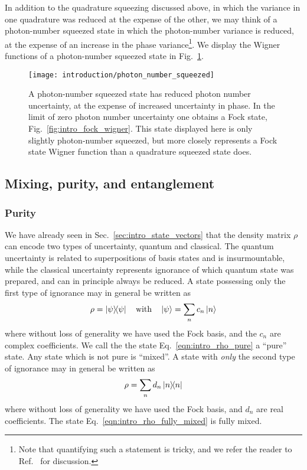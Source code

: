 In addition to the quadrature squeezing discussed above, in which the variance in one quadrature was reduced at the expense of the other, we may think of a photon-number squeezed state in which the photon-number variance is reduced, at the expense of an increase in the phase variance\footnote{Note that quantifying such a statement is tricky, and we refer the reader to Ref.~\cite{Barnett_red_book} for discussion.}. We display the Wigner functions of a photon-number squeezed state in Fig.~\ref{fig:intro_photon_number_squeezed_wigner}.

\begin{figure}[htp]
\centering
\captionsetup{width=0.8\linewidth}
\texttt{[image: introduction/photon\_number\_squeezed]}
\caption{\label{fig:intro_photon_number_squeezed_wigner} A photon-number squeezed state has reduced photon number uncertainty, at the expense of increased uncertainty in phase. In the limit of zero photon number uncertainty one obtains a Fock state, Fig.~\ref{fig:intro_fock_wigner}. This state displayed here is only slightly photon-number squeezed, but more closely represents a Fock state Wigner function than a quadrature squeezed state does. }
\end{figure}



\FloatBarrier
\subsection{Mixing, purity, and entanglement}

\subsubsection{Purity}
We have already seen in Sec.~\ref{sec:intro_state_vectors} that the density matrix $\rho$ can encode two types of uncertainty, quantum and classical. The quantum uncertainty is related to superpositions of basis states and is insurmountable, while the classical uncertainty represents ignorance of which quantum state was prepared, and can in principle always be reduced. A state possessing only the first type of ignorance may in general be written as
\begin{equation}\label{eqn:intro_rho_pure}
\rho = \dyad{\psi} \qq{with} \ket{\psi} = \sum_n c_n \ket{n}
\end{equation}
where without loss of generality we have used the Fock basis, and the $c_n$ are complex coefficients. We call the the state Eq.~\ref{eqn:intro_rho_pure} a ``pure'' state. Any state which is not pure is ``mixed''. A state with \emph{only} the second type of ignorance may in general be written as
\begin{equation}\label{eqn:intro_rho_fully_mixed}
\rho = \sum_n d_n \dyad{n}
\end{equation}
where without loss of generality we have used the Fock basis, and $d_n$ are real coefficients. The state Eq.~\ref{eqn:intro_rho_fully_mixed} is fully mixed.

